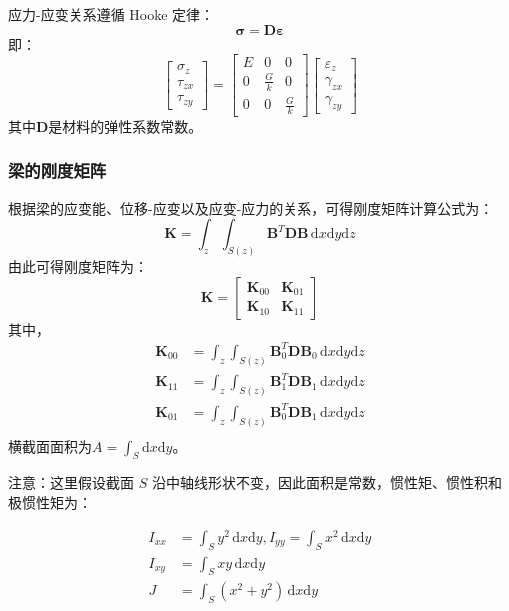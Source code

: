 \documentclass{article}
\begin{document}
应力-应变关系遵循 Hooke 定律：
$$\bm{\sigma}=\bm{D}\bm{\varepsilon}$$
即：
$$\begin{bmatrix}
\sigma_{z} \\
\tau_{zx} \\
\tau_{zy}
\end{bmatrix}  = \begin{bmatrix}
E & 0 & 0\\
0 & \frac{G}{k} & 0\\
0 & 0 & \frac{G}{k}
\end{bmatrix}\begin{bmatrix}
\varepsilon_z \\
\gamma_{zx} \\
\gamma_{zy}
\end{bmatrix}$$
其中$\bm{D}$是材料的弹性系数常数。

\subsubsection{梁的刚度矩阵}
根据梁的应变能、位移-应变以及应变-应力的关系，可得刚度矩阵计算公式为：
$$\bm{K}=
\int_z\int_{S(z)}
\bm{B}^T\bm{D}\bm{B}\,
\mathrm{d}x\mathrm{d}y\mathrm{d}z$$
由此可得刚度矩阵为：
$$\bm{K} = 
\begin{bmatrix}
\bm{K}_{00} & \bm{K}_{01} \\
\bm{K}_{10} & \bm{K}_{11}
\end{bmatrix}$$
其中，
\begin{align*}
    \bm{K}_{00} &= \int_z\int_{S(z)}
\bm{B}^T_0\bm{D}\bm{B}_0\,\mathrm{d}x\mathrm{d}y\mathrm{d}z \\
    \bm{K}_{11} &= \int_z\int_{S(z)}
\bm{B}^T_1\bm{D}\bm{B}_1\,
\mathrm{d}x\mathrm{d}y\mathrm{d}z \\
    \bm{K}_{01} &= \int_z\int_{S(z)}
\bm{B}^T_0\bm{D}\bm{B}_1\,
\mathrm{d}x\mathrm{d}y\mathrm{d}z \\
\end{align*}
横截面面积为$A=\int_{S}\mathrm{d}x\mathrm{d}y$。

注意：这里假设截面 $S$ 沿中轴线形状不变，因此面积是常数，惯性矩、惯性积和极惯性矩为：

\begin{align*}
	I_{xx} &= \int_Sy^2\,\mathrm{d}x\mathrm{d}y,I_{yy}=\int_Sx^2\,\mathrm{d}x\mathrm{d}y \\
	I_{xy} &= \int_Sxy\,\mathrm{d}x\mathrm{d}y \\
	J &= \int_S(x^2+y^2)\,\mathrm{d}x\mathrm{d}y
\end{align*}
\end{document}

